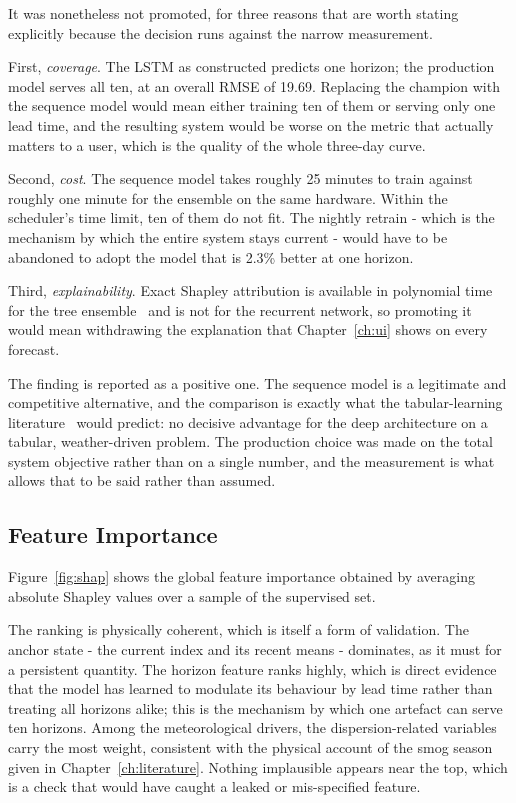 It was nonetheless not promoted, for three reasons that are worth stating
explicitly because the decision runs against the narrow measurement.

First, \emph{coverage}. The LSTM as constructed predicts one horizon; the
production model serves all ten, at an overall RMSE of 19.69. Replacing the
champion with the sequence model would mean either training ten of them or serving
only one lead time, and the resulting system would be worse on the metric that
actually matters to a user, which is the quality of the whole three-day curve.

Second, \emph{cost}. The sequence model takes roughly 25 minutes to train against
roughly one minute for the ensemble on the same hardware. Within the scheduler's
time limit, ten of them do not fit. The nightly retrain - which is the mechanism
by which the entire system stays current - would have to be abandoned to adopt
the model that is 2.3\% better at one horizon.

Third, \emph{explainability}. Exact Shapley attribution is available in polynomial
time for the tree ensemble~\cite{ref:treeshap} and is not for the recurrent
network, so promoting it would mean withdrawing the explanation that
Chapter~\ref{ch:ui} shows on every forecast.

The finding is reported as a positive one. The sequence model is a legitimate and
competitive alternative, and the comparison is exactly what the tabular-learning
literature~\cite{ref:tabnotall,ref:whytrees} would predict: no decisive advantage
for the deep architecture on a tabular, weather-driven problem. The production
choice was made on the total system objective rather than on a single number, and
the measurement is what allows that to be said rather than assumed.

\subsection{Feature Importance}
Figure~\ref{fig:shap} shows the global feature importance obtained by averaging
absolute Shapley values over a sample of the supervised set.


The ranking is physically coherent, which is itself a form of validation. The
anchor state - the current index and its recent means - dominates, as it must
for a persistent quantity. The horizon feature ranks highly, which is direct
evidence that the model has learned to modulate its behaviour by lead time rather
than treating all horizons alike; this is the mechanism by which one artefact can
serve ten horizons. Among the meteorological drivers, the dispersion-related
variables carry the most weight, consistent with the physical account of the smog
season given in Chapter~\ref{ch:literature}. Nothing implausible appears near the
top, which is a check that would have caught a leaked or mis-specified feature.

